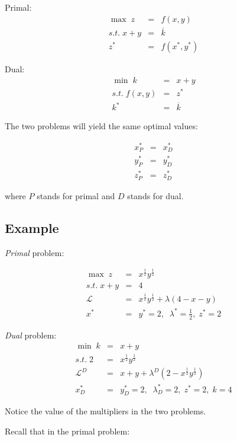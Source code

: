 \documentclass[11pt,english]{article}
\begin{document}
Primal: 
\begin{eqnarray*}
\max \;z &=&f(x,y) \\
s.t.\;x+y &=&\overline{k} \\
z^{\ast } &=&f(x^{\ast },y^{\ast })
\end{eqnarray*}

Dual: 
\begin{eqnarray*}
\min \;k &=&x+y \\
s.t.\;f(x,y) &=&z^{\ast } \\
k^{\ast } &=&\overline{k}
\end{eqnarray*}

The two problems will yield the same optimal values:

\begin{eqnarray*}
x_{P}^{\ast } &=&x_{D}^{\ast } \\
y_{P}^{\ast } &=&y_{D}^{\ast } \\
z_{P}^{\ast } &=&z_{D}^{\ast }
\end{eqnarray*}

where $P$ stands for primal and $D$ stands for dual.

\subsection{Example}

\textit{Primal} problem:

\begin{eqnarray*}
\max \;z &=&x^{\frac{1}{2}}y^{\frac{1}{2}} \\
s.t.\;x+y &=&4 \\
\mathcal{L} &=&x^{\frac{1}{2}}y^{\frac{1}{2}}+\lambda (4-x-y) \\
x^{\ast } &=&y^{\ast }=2,\;\;\lambda ^{\ast }=\frac{1}{2},\;z^{\ast }=2
\end{eqnarray*}

\textit{Dual} problem: 
\begin{eqnarray*}
\min \;k &=&x+y \\
s.t.\;2 &=&x^{\frac{1}{2}}y^{\frac{1}{2}} \\
\mathcal{L} ^{D} &=&x+y+\lambda ^{D}(2-x^{\frac{1}{2}}y^{\frac{1}{2}}) \\
x_{D}^{\ast } &=&y_{D}^{\ast }=2,\;\;\lambda _{D}^{\ast }=2,\;z^{\ast
}=2,\;k=4
\end{eqnarray*}

Notice the value of the multipliers in the two problems.

Recall that in the primal problem:
\end{document}
